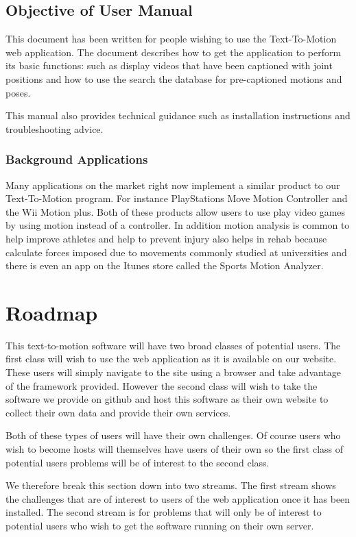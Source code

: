 \documentclass{scrreprt}
\begin{document}
\subsection{Objective of User Manual}

This document has been written for people wishing to use the Text-To-Motion web application.  The document describes how to get the application to perform its basic functions: such as display videos that have been captioned with joint positions and how to use the search the database for pre-captioned motions and poses.

This manual also provides technical guidance such as installation instructions and troubleshooting advice.

\subsubsection{Background Applications}
Many applications on the market right now implement a similar product to our Text-To-Motion program.  For instance PlayStations Move Motion Controller and the Wii Motion plus.  Both of these products allow users to use play video games by using motion instead of a controller.  In addition motion analysis is common to help improve athletes and help to prevent injury also helps in rehab because calculate forces imposed due to movements commonly studied at universities and there is even an app on the Itunes store called the Sports Motion Analyzer.

\section{Roadmap}

This text-to-motion software will have two broad classes of potential users.  The first class will wish to use the web application as it is available on our website.  These users will simply navigate to the site using a browser and take advantage of the framework provided. However the second class will wish to take the software we provide on github and host this software as their own website to collect their own data and provide their own services.

Both of these types of users will have their own challenges.  Of course users who wish to become hosts will themselves have users of their own so the first class of potential users problems will be of interest to the second class.  

We therefore break this section down into two streams.  The first stream shows the challenges that are of interest to users of the web application once it has been installed.  The second stream is for problems that will only be of interest to potential users who wish to get the software running on their own server.
\end{document}
